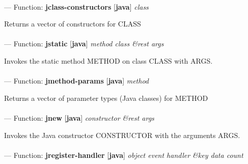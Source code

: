 \paragraph{}
\label{JAVA:JCLASS-CONSTRUCTORS}
--- Function: \textbf{jclass-constructors} [\textbf{java}] \textit{class}

\begin{adjustwidth}{5em}{5em}
Returns a vector of constructors for CLASS
\end{adjustwidth}

\paragraph{}
\label{JAVA:JSTATIC}
--- Function: \textbf{jstatic} [\textbf{java}] \textit{method class \&rest args}

\begin{adjustwidth}{5em}{5em}
Invokes the static method METHOD on class CLASS with ARGS.
\end{adjustwidth}

\paragraph{}
\label{JAVA:JMETHOD-PARAMS}
--- Function: \textbf{jmethod-params} [\textbf{java}] \textit{method}

\begin{adjustwidth}{5em}{5em}
Returns a vector of parameter types (Java classes) for METHOD
\end{adjustwidth}

\paragraph{}
\label{JAVA:JNEW}
--- Function: \textbf{jnew} [\textbf{java}] \textit{constructor \&rest args}

\begin{adjustwidth}{5em}{5em}
Invokes the Java constructor CONSTRUCTOR with the arguments ARGS.
\end{adjustwidth}

\paragraph{}
\label{JAVA:JREGISTER-HANDLER}
--- Function: \textbf{jregister-handler} [\textbf{java}] \textit{object event handler \&key data count}

